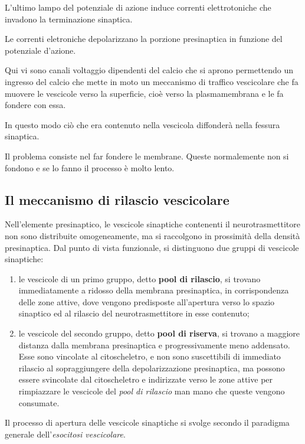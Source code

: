 \documentclass[]{article}
\begin{document}
L'ultimo lampo del potenziale di azione induce correnti elettrotoniche
che invadono la terminazione sinaptica.

Le correnti eletroniche depolarizzano la porzione presinaptica in
funzione del potenziale d'azione.

Qui vi sono canali voltaggio dipendenti del calcio che si aprono
permettendo un ingresso del calcio che mette in moto un meccanismo di
traffico vescicolare che fa muovere le vescicole verso la superficie,
cioè verso la plasmamembrana e le fa fondere con essa.

In questo modo ciò che era contenuto nella vescicola diffonderà nella
fessura sinaptica.

Il problema consiste nel far fondere le membrane. Queste normalemente
non si fondono e se lo fanno il processo è molto lento.

\subsection{Il meccanismo di rilascio
vescicolare}\label{il-meccanismo-di-rilascio-vescicolare}

Nell'elemente presinaptico, le vescicole sinaptiche contenenti il
neurotrasmettitore non sono distribuite omogeneamente, ma si raccolgono
in prossimità della densità presinaptica. Dal punto di vista funzionale,
si distinguono due gruppi di vescicole sinaptiche:

\begin{enumerate}
\def\labelenumi{\arabic{enumi}.}
\itemsep1pt\parskip0pt
\item
  le vescicole di un primo gruppo, detto \textbf{pool di rilascio}, si
  trovano immediatamente a ridosso della membrana presinaptica, in
  corrispondenza delle zone attive, dove vengono predisposte
  all'apertura verso lo spazio sinaptico ed al rilascio del
  neurotrasmettitore in esse contenuto;
\item
  le vescicole del secondo gruppo, detto \textbf{pool di riserva}, si
  trovano a maggiore distanza dalla membrana presinaptica e
  progressivamente meno addensato. Esse sono vincolate al citoscheletro,
  e non sono suscettibili di immediato rilascio al sopraggiungere della
  depolarizzazione presinaptica, ma possono essere svincolate dal
  citoscheletro e indirizzate verso le zone attive per rimpiazzare le
  vescicole del \emph{pool di rilascio} man mano che queste vengono
  consumate.
\end{enumerate}

Il processo di apertura delle vescicole sinaptiche si svolge secondo il
paradigma generale dell'\emph{esocitosi vescicolare}.
\end{document}
